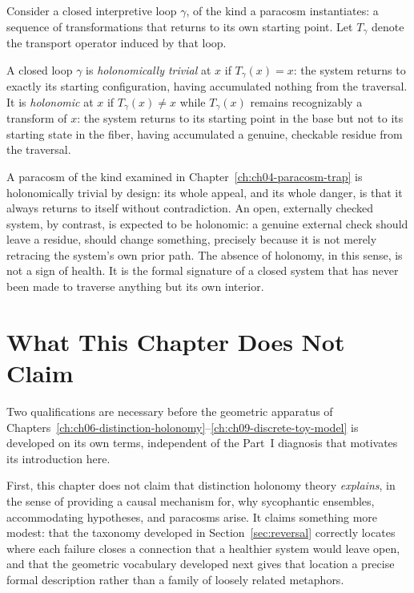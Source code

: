 Consider a closed interpretive loop $\gamma$, of the kind a paracosm instantiates: a sequence of transformations that returns to its own starting point. Let $T_\gamma$ denote the transport operator induced by that loop.

\begin{definition}
A closed loop $\gamma$ is \emph{holonomically trivial} at $x$ if $T_\gamma(x) = x$: the system returns to exactly its starting configuration, having accumulated nothing from the traversal. It is \emph{holonomic} at $x$ if $T_\gamma(x) \neq x$ while $T_\gamma(x)$ remains recognizably a transform of $x$: the system returns to its starting point in the base but not to its starting state in the fiber, having accumulated a genuine, checkable residue from the traversal.
\end{definition}

A paracosm of the kind examined in Chapter~\ref{ch:ch04-paracosm-trap} is holonomically trivial by design: its whole appeal, and its whole danger, is that it always returns to itself without contradiction. An open, externally checked system, by contrast, is expected to be holonomic: a genuine external check should leave a residue, should change something, precisely because it is not merely retracing the system's own prior path. The absence of holonomy, in this sense, is not a sign of health. It is the formal signature of a closed system that has never been made to traverse anything but its own interior.

\section{What This Chapter Does Not Claim}

Two qualifications are necessary before the geometric apparatus of Chapters~\ref{ch:ch06-distinction-holonomy}--\ref{ch:ch09-discrete-toy-model} is developed on its own terms, independent of the Part~I diagnosis that motivates its introduction here.

First, this chapter does not claim that distinction holonomy theory \emph{explains}, in the sense of providing a causal mechanism for, why sycophantic ensembles, accommodating hypotheses, and paracosms arise. It claims something more modest: that the taxonomy developed in Section~\ref{sec:reversal} correctly locates where each failure closes a connection that a healthier system would leave open, and that the geometric vocabulary developed next gives that location a precise formal description rather than a family of loosely related metaphors.

